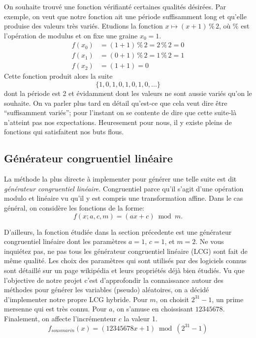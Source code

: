 \documentclass[10pt]{article} %
\begin{document}
On souhaite trouvé une fonction vérifianté certaines qualités désirées. Par exemple, on veut que notre fonction ait une période suffisamment long et qu'elle
produise des valeurs très variés. Etudions la fonction $x \mapsto (x + 1) \mathbin{\%} 2$, où \% est l'opération de modulus et on fixe une graine $x_0 = 1$.
\begin{align*}
    f(x_0) &= (1 + 1) \mathbin{\%} 2 = 2 \mathbin{\%} 2 = 0 \\
    f(x_1) &= (0 + 1) \mathbin{\%} 2 = 1 \mathbin{\%} 2 = 1 \\
    f(x_2) &= (1 + 1) = 0
\end{align*}
Cette fonction produit alors la suite
\begin{equation*}
    \{1, 0, 1, 0, 1, 0, 1, 0, ...\}
\end{equation*}
dont la période est 2 et évidamment dont les valeurs ne sont aussie variés qu'on le souhaite. On va parler plus tard en détail qu'est-ce que cela veut dire être
``suffisamment variés''; pour l'instant on se contente de dire que cette suite-là n'atteint pas nos expectations. Heuresement pour nous, il y existe pleins de fonctions
qui satisfaitent nos buts flous.

\subsection{Générateur congruentiel linéaire}

La méthode la plus directe à implementer pour générer une telle suite est dit \textit{générateur congruentiel linéaire}. Congruentiel parce qu'il s'agit d'une opération modulo et
linéaire vu qu'il y est compris une transformation affine. Dans le cas général, on considère les fonctions de la forme:
$$
    f(x; a, c, m) = (ax + c) \bmod m.
$$

D'ailleurs, la fonction étudiée dans la section précedente est une générateur congruentiel linéaire dont les paramètres $a = 1$, $c = 1$, et $m = 2$. Ne vous inquiétez pas, ne pas tous les
générateur congruentiel linéaire (LCG) sont fait de même qualité. Les choix des paramètres qui sont utilisés par des logiciels connus sont détaillé sur un page wikipédia et leurs propriétés déjà
bien étudiés. Vu que l'objective de notre projet c'est d'approfondir la connaissance autour des méthodes pour générer les variables (pseudo) aléatoires, on a décidé d'implementer notre propre LCG hybride.
Pour $m$, on choisit $2^{31} - 1$, un prime mersenne qui est très connu. Pour $a$, on s'amuse en choissisant $12345678$. Finalement, on affecte l'incrémenteur $c$ la valeur 1.
$$
    f_{sousmarin}(x) = (12345678x + 1) \bmod (2^{31} - 1)
$$
\end{document}
